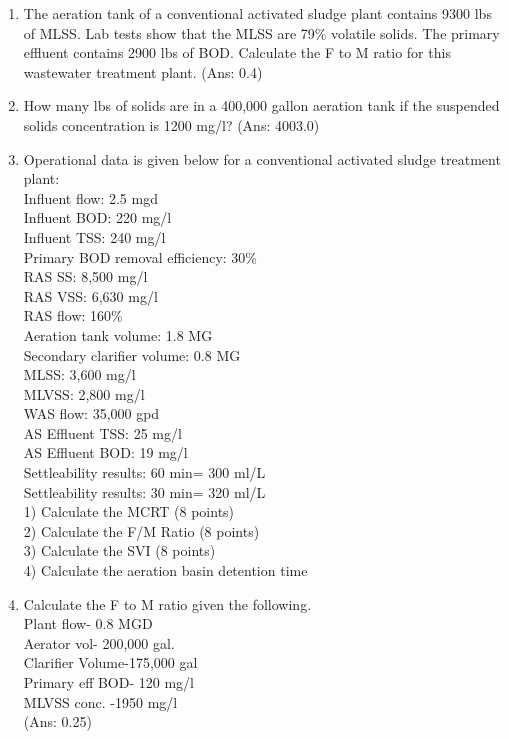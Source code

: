\begin{enumerate}
\item The aeration tank of a conventional activated sludge plant contains 9300 lbs of MLSS. Lab tests show that the MLSS are 79\% volatile solids. The primary effluent contains 2900 lbs of BOD. Calculate the F to M ratio for this wastewater treatment plant. (Ans: 0.4) \\

\item How many lbs of solids are in a 400,000 gallon aeration tank if the suspended solids concentration is 1200 mg/l?  (Ans:  4003.0)\\


\item Operational data is given below for a conventional activated sludge treatment plant:\\
Influent flow: 2.5 mgd\\
Influent BOD: 220 mg/l\\
Influent TSS: 240 mg/l\\
Primary BOD removal efficiency: 30\%\\
RAS SS: 8,500 mg/l\\
RAS VSS: 6,630 mg/l\\
RAS flow: 160\%\\
Aeration tank volume: 1.8 MG\\
Secondary clarifier volume: 0.8 MG\\
MLSS: 3,600 mg/l\\
MLVSS: 2,800 mg/l\\
WAS flow: 35,000 gpd\\
AS Effluent TSS: 25 mg/l\\
AS Effluent BOD: 19 mg/l\\
Settleability results: 60 min= 300 ml/L\\
Settleability results: 30 min= 320 ml/L\\
1) Calculate the MCRT (8 points)\\
2) Calculate the F/M Ratio (8 points)\\
3) Calculate the SVI (8 points)\\
4) Calculate the aeration basin detention time\\

\item Calculate the F to M ratio given the following.\\
Plant flow- 0.8 MGD\\
Aerator vol- 200,000 gal.\\
Clarifier Volume-175,000 gal\\
Primary eff BOD- 120 mg/l\\
MLVSS conc. -1950 mg/l\\
(Ans:  0.25)\\



\end{enumerate}
